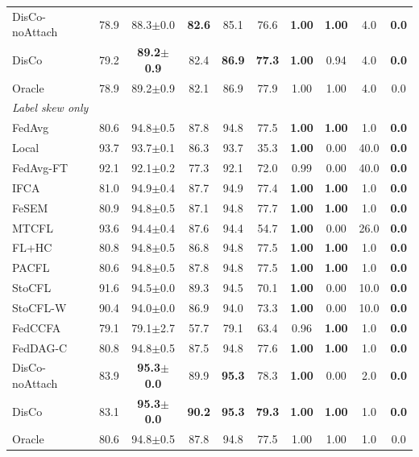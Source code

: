 \begin{tabular}{lccccccccc}
DisCo-noAttach & 78.9 & 88.3$\pm$0.0 & \textbf{82.6} & 85.1 & 76.6 & \textbf{1.00} & \textbf{1.00} & 4.0 & \textbf{0.0} \\
DisCo & 79.2 & \textbf{89.2$\pm$0.9} & 82.4 & \textbf{86.9} & \textbf{77.3} & \textbf{1.00} & 0.94 & 4.0 & \textbf{0.0} \\
Oracle & 78.9 & 89.2$\pm$0.9 & 82.1 & 86.9 & 77.9 & 1.00 & 1.00 & 4.0 & 0.0 \\
\midrule
\multicolumn{10}{l}{\textit{Label skew only}}\\
FedAvg & 80.6 & 94.8$\pm$0.5 & 87.8 & 94.8 & 77.5 & \textbf{1.00} & \textbf{1.00} & 1.0 & \textbf{0.0} \\
Local & 93.7 & 93.7$\pm$0.1 & 86.3 & 93.7 & 35.3 & \textbf{1.00} & 0.00 & 40.0 & \textbf{0.0} \\
FedAvg-FT & 92.1 & 92.1$\pm$0.2 & 77.3 & 92.1 & 72.0 & 0.99 & 0.00 & 40.0 & \textbf{0.0} \\
IFCA & 81.0 & 94.9$\pm$0.4 & 87.7 & 94.9 & 77.4 & \textbf{1.00} & \textbf{1.00} & 1.0 & \textbf{0.0} \\
FeSEM & 80.9 & 94.8$\pm$0.5 & 87.1 & 94.8 & 77.7 & \textbf{1.00} & \textbf{1.00} & 1.0 & \textbf{0.0} \\
MTCFL & 93.6 & 94.4$\pm$0.4 & 87.6 & 94.4 & 54.7 & \textbf{1.00} & 0.00 & 26.0 & \textbf{0.0} \\
FL+HC & 80.8 & 94.8$\pm$0.5 & 86.8 & 94.8 & 77.5 & \textbf{1.00} & \textbf{1.00} & 1.0 & \textbf{0.0} \\
PACFL & 80.6 & 94.8$\pm$0.5 & 87.8 & 94.8 & 77.5 & \textbf{1.00} & \textbf{1.00} & 1.0 & \textbf{0.0} \\
StoCFL & 91.6 & 94.5$\pm$0.0 & 89.3 & 94.5 & 70.1 & \textbf{1.00} & 0.00 & 10.0 & \textbf{0.0} \\
StoCFL-W & 90.4 & 94.0$\pm$0.0 & 86.9 & 94.0 & 73.3 & \textbf{1.00} & 0.00 & 10.0 & \textbf{0.0} \\
FedCCFA & 79.1 & 79.1$\pm$2.7 & 57.7 & 79.1 & 63.4 & 0.96 & \textbf{1.00} & 1.0 & \textbf{0.0} \\
FedDAG-C & 80.8 & 94.8$\pm$0.5 & 87.5 & 94.8 & 77.6 & \textbf{1.00} & \textbf{1.00} & 1.0 & \textbf{0.0} \\
DisCo-noAttach & 83.9 & \textbf{95.3$\pm$0.0} & 89.9 & \textbf{95.3} & 78.3 & \textbf{1.00} & 0.00 & 2.0 & \textbf{0.0} \\
DisCo & 83.1 & \textbf{95.3$\pm$0.0} & \textbf{90.2} & \textbf{95.3} & \textbf{79.3} & \textbf{1.00} & \textbf{1.00} & 1.0 & \textbf{0.0} \\
Oracle & 80.6 & 94.8$\pm$0.5 & 87.8 & 94.8 & 77.5 & 1.00 & 1.00 & 1.0 & 0.0 \\

\end{tabular}
